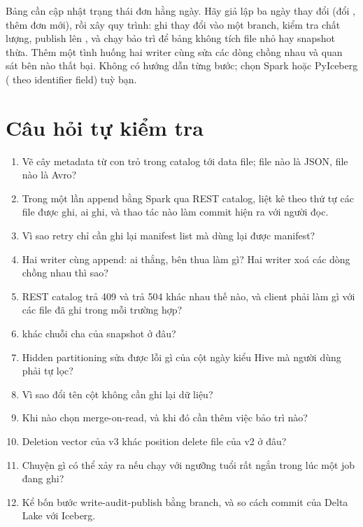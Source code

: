 \begin{thuthach}
Bảng  cần cập nhật trạng thái đơn hằng ngày. Hãy giả lập ba ngày thay đổi (đổi , thêm đơn mới), rồi xây quy trình: ghi thay đổi vào một branch, kiểm tra chất lượng, publish lên , và chạy bảo trì để bảng không tích file nhỏ hay snapshot thừa. Thêm một tình huống hai writer cùng sửa các dòng chồng nhau và quan sát bên nào thất bại. Không có hướng dẫn từng bước; chọn Spark hoặc PyIceberg ( theo identifier field) tuỳ bạn.
\end{thuthach}

\section{Câu hỏi tự kiểm tra}
\begin{enumerate}
  \item Vẽ cây metadata từ con trỏ trong catalog tới data file; file nào là JSON, file nào là Avro?
  \item Trong một lần append bằng Spark qua REST catalog, liệt kê theo thứ tự các file được ghi, ai ghi, và thao tác nào làm commit hiện ra với người đọc.
  \item Vì sao retry chỉ cần ghi lại manifest list mà dùng lại được manifest?
  \item Hai writer cùng append: ai thắng, bên thua làm gì? Hai writer xoá các dòng chồng nhau thì sao?
  \item REST catalog trả 409 và trả 504 khác nhau thế nào, và client phải làm gì với các file đã ghi trong mỗi trường hợp?
  \item {} khác chuỗi cha của snapshot ở đâu?
  \item Hidden partitioning sửa được lỗi gì của cột ngày kiểu Hive mà người dùng phải tự lọc?
  \item Vì sao đổi tên cột không cần ghi lại dữ liệu?
  \item Khi nào chọn merge-on-read, và khi đó cần thêm việc bảo trì nào?
  \item Deletion vector của v3 khác position delete file của v2 ở đâu?
  \item Chuyện gì có thể xảy ra nếu  chạy với ngưỡng tuổi rất ngắn trong lúc một job đang ghi?
  \item Kể bốn bước write-audit-publish bằng branch, và so cách commit của Delta Lake với Iceberg.
\end{enumerate}

